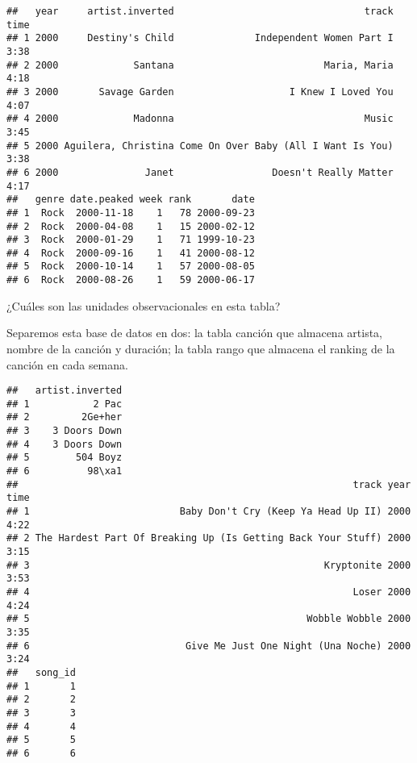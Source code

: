 \documentclass[]{article}
\newenvironment{Shaded}{\begin{snugshade}}{\end{snugshade}}
\newcommand{\KeywordTok}[1]{\textcolor[rgb]{0.13,0.29,0.53}{\textbf{{#1}}}}
\newcommand{\DataTypeTok}[1]{\textcolor[rgb]{0.13,0.29,0.53}{{#1}}}
\newcommand{\StringTok}[1]{\textcolor[rgb]{0.31,0.60,0.02}{{#1}}}
\newcommand{\NormalTok}[1]{{#1}}
\begin{document}
\begin{verbatim}
##   year     artist.inverted                                 track time
## 1 2000     Destiny's Child              Independent Women Part I 3:38
## 2 2000             Santana                          Maria, Maria 4:18
## 3 2000       Savage Garden                    I Knew I Loved You 4:07
## 4 2000             Madonna                                 Music 3:45
## 5 2000 Aguilera, Christina Come On Over Baby (All I Want Is You) 3:38
## 6 2000               Janet                 Doesn't Really Matter 4:17
##   genre date.peaked week rank       date
## 1  Rock  2000-11-18    1   78 2000-09-23
## 2  Rock  2000-04-08    1   15 2000-02-12
## 3  Rock  2000-01-29    1   71 1999-10-23
## 4  Rock  2000-09-16    1   41 2000-08-12
## 5  Rock  2000-10-14    1   57 2000-08-05
## 6  Rock  2000-08-26    1   59 2000-06-17
\end{verbatim}

¿Cuáles son las unidades observacionales en esta tabla?

Separemos esta base de datos en dos: la tabla canción que almacena
artista, nombre de la canción y duración; la tabla rango que almacena el
ranking de la canción en cada semana.

\begin{Shaded}
\end{Shaded}

\begin{verbatim}
##   artist.inverted
## 1           2 Pac
## 2         2Ge+her
## 3    3 Doors Down
## 4    3 Doors Down
## 5        504 Boyz
## 6          98\xa1
##                                                          track year time
## 1                          Baby Don't Cry (Keep Ya Head Up II) 2000 4:22
## 2 The Hardest Part Of Breaking Up (Is Getting Back Your Stuff) 2000 3:15
## 3                                                   Kryptonite 2000 3:53
## 4                                                        Loser 2000 4:24
## 5                                                Wobble Wobble 2000 3:35
## 6                           Give Me Just One Night (Una Noche) 2000 3:24
##   song_id
## 1       1
## 2       2
## 3       3
## 4       4
## 5       5
## 6       6
\end{verbatim}
\end{document}
